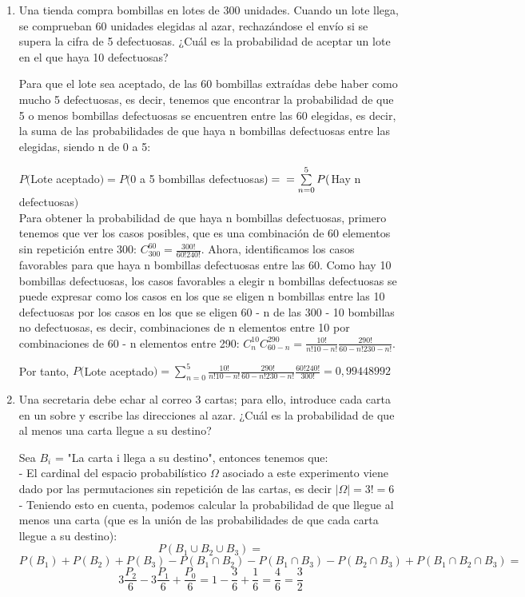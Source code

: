 \documentclass[a4paper,12pt]{article}
\begin{document}
\begin{enumerate}
\item Una tienda compra bombillas en lotes de 300 unidades. Cuando un lote llega, se comprueban 60 unidades elegidas al azar, rechazándose el envío si se supera la cifra de 5 defectuosas. ¿Cuál es la probabilidad de aceptar un lote en el que haya 10 defectuosas?

Para que el lote sea aceptado, de las 60 bombillas extraídas debe haber como mucho 5 defectuosas, es decir, tenemos que encontrar la probabilidad de que 5 o menos bombillas defectuosas se encuentren entre las 60 elegidas, es decir, la suma de las probabilidades de que haya n bombillas defectuosas entre las elegidas, siendo n de 0 a 5:

$P($Lote aceptado$)=P($0 a 5 bombillas defectuosas$)= \\
= \sum\limits_{n=0}^5P($Hay n defectuosas$)$\\

Para obtener la probabilidad de que haya n bombillas defectuosas, primero tenemos que ver los casos posibles, que es una combinación de 60 elementos sin repetición entre 300: $C_{300}^{60}=\frac{300!}{60!240!}$.
Ahora, identificamos los casos favorables para que haya n bombillas defectuosas entre las 60. Como hay 10 bombillas defectuosas, los casos favorables a elegir n bombillas defectuosas se puede expresar como los casos en los que se eligen n bombillas entre las 10 defectuosas por los casos en los que se eligen 60 - n de las 300 - 10 bombillas no defectuosas, es decir, combinaciones de n elementos entre 10 por combinaciones de 60 - n elementos entre 290: $C_n^{10}C_{60-n}^{290}=\frac{10!}{n!10-n!}\frac{290!}{60-n!230-n!}$.

Por tanto, $P($Lote aceptado$)=\sum\limits_{n=0}^5\frac{10!}{n!10-n!}\frac{290!}{60-n!230-n!}\frac{60!240!}{300!}=0,99448992$


\item Una secretaria debe echar al correo 3 cartas; para ello, introduce cada carta en un sobre y escribe las direcciones al azar. ¿Cuál es la probabilidad de que al menos una carta llegue a su destino?

Sea $B_i$ = "La carta i llega a su destino", entonces tenemos que:\\
- El cardinal del espacio probabilístico $\Omega$ asociado a este experimento viene dado por las permutaciones sin repetición de las cartas, es decir $|\Omega| = 3! = 6$\\
- Teniendo esto en cuenta, podemos calcular la probabilidad de que llegue al menos una carta (que es la unión de las probabilidades de que cada carta llegue a su destino):
$$P(B_1 \cup B_2 \cup B_3) =$$
$$P(B_1) + P(B_2) + P(B_3)-P(B_1\cap B_2) -P(B_1 \cap B_3)-P(B_2\cap B_3) + P(B_1\cap B_2\cap B_3) =$$
$$3\frac{P_2}{6} - 3\frac{P_1}{6}+ \frac{P_0}{6} = 1 - \frac{3}{6} + \frac{1}{6}= \frac{4}{6}=\frac{3}{2}$$

\end{enumerate}
\end{document}
